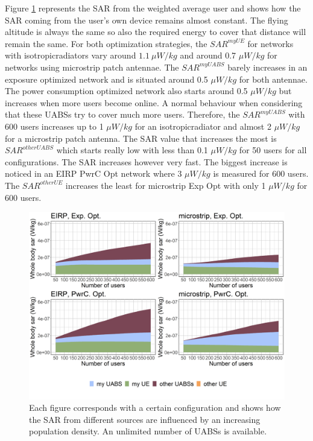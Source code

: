 \documentclass[twocolumn]{phdsymp} %
\begin{document}
Figure \ref{fig:s3b_fourSourcesMatrix} represents the 
\gls{SAR} from the weighted average user and shows how the \gls{SAR} coming from the user's own device remains almost constant. 
The flying altitude is always the same so 
also the required energy to cover that distance will remain the same. 
For both optimization strategies, the $SAR^{myUE}$ for networks with \gls{isotropicradiator}s vary around $1.1\ \mu W/kg$  %
 and around  0.7 $\mu W/kg$ for networks using microstrip patch antennae.
The $SAR^{myUABS}$ barely increases in an exposure optimized network and is situated around 0.5 $\mu W/kg$ for both antennae.
The power consumption optimized network also starts around 0.5 $\mu W/kg$ but increases when more users become online. 
A normal behaviour when considering that these \gls{UABS}s try to cover much more users. Therefore, the $SAR^{myUABS}$ 
with 600 users increases up to 1 $\mu W/kg$ for an \gls{isotropicradiator} and almost 2 $\mu W/kg$ for a microstrip patch antenna.
The \gls{SAR} value that increases the most is $SAR^{otherUABS}$ which 
starts really low with less than 0.1 $\mu W/kg$ for 50 users for all configurations. 
The \gls{SAR} increases however very fast. The biggest increase is noticed in an \gls{EIRP} \gls{PwrC Opt} network 
where 3 $\mu W/kg$ is measured for 600 users. The $SAR^{otherUE}$ increases the least for microstrip \gls{Exp Opt} with 
only 1 $\mu W/kg$ for 600 users.
\begin{figure}[h!]
  \includegraphics[width=\linewidth]{../results/s3/uFourSources.png}
  \caption{Each figure corresponds with a certain configuration and shows how the \acs{SAR} 
  from different sources are influenced by an increasing population density. An unlimited number of \acs{UABS}s is available.
}
  \label{fig:s3b_fourSourcesMatrix}
\end{figure}
\end{document}
